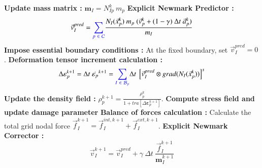 \documentclass[preprint,12pt,a4paper]{elsarticle}
\newcommand{\tens}[1]{
  \ensuremath{\mathbf{{#1}}}
}
\newcommand\Grad[1]{grad({#1})}
\begin{document}
\begin{algorithm}[H]
  \DontPrintSemicolon
    \textbf{Update mass matrix :} $ \tens{m}_{I} = N_{Ip}^{k}\ m_p$ \;
    \textbf{Explicit Newmark Predictor :}
    \begin{equation*}
      \vec{v}_I^{pred} = \textcolor{blue}{\sum_{p\ \in\ \mathcal{C}}} \frac{ N_{I}(\vec{x}_p^k)\  m_p\ (\vec{v}_p^k + (1 - \gamma)\ \Delta t\ \vec{a}_p^k)}{m_I}
    \end{equation*}\;
    \vspace{-0.5cm}
    \textbf{Impose essential boundary conditions :} At the fixed
    boundary, set $\vec{v}_{I}^{pred} = 0$.\; 
    \textbf{Deformation tensor increment calculation :}
    \begin{equation*}
      \Delta \tens{\varepsilon}_{p}^{k+1} = \Delta t\
        \dot{\tens{\varepsilon}_{p}}^{k+1} =  \textcolor{blue}{\sum_{I\ \in\ \mathcal{B}_p}} \Delta t\ \left[ \vec{v}_{I}^{pred} \otimes
        \Grad{N_{I}(\vec{x}_p^k)} \right]^s
    \end{equation*}\;
    \vspace{-0.5cm}
    \textbf{Update the density field :} $\rho_p^{k+1} =
    \frac{\rho_p^k}{1 + \mathit{tra}\left[\Delta\tens{\varepsilon}_{p}^{k+1}\right]}.$\;
    \textbf{Compute stress field and update damage parameter}\;
    \textbf{Balance of forces calculation :} Calculate the total grid
    nodal force $\vec{f}_{I}^{k+1} = \vec{f}_{I}^{int,k+1} + \vec{f}_{I}^{ext,k+1}$.\;
    \textbf{Explicit Newmark Corrector :}
    \begin{equation*}
      \vec{v}_{I}^{k+1} = \vec{v}_{I}^{pred} + \gamma\ \Delta t\ \frac{\vec{f}_{I}^{k+1}}{\tens{m}_I^{k+1}}  
    \end{equation*}\;
    \vspace{-0.5cm}

\end{algorithm}
\end{document}
